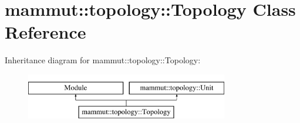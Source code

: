 \hypertarget{classmammut_1_1topology_1_1Topology}{\section{mammut\-:\-:topology\-:\-:Topology Class Reference}
\label{classmammut_1_1topology_1_1Topology}
}
Inheritance diagram for mammut\-:\-:topology\-:\-:Topology\-:\begin{figure}[H]
\begin{center}
\leavevmode
\includegraphics[height=2.000000cm]{classmammut_1_1topology_1_1Topology}
\end{center}
\end{figure}
